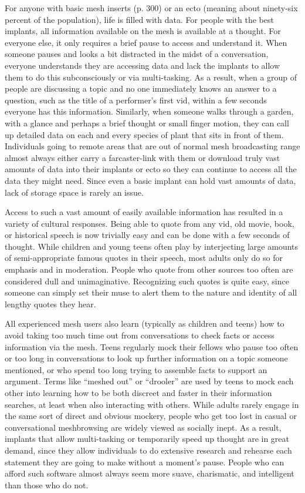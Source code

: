 For anyone with basic mesh inserts (p. 300) or an ecto 
(meaning about ninety-six percent of the population), 
life is filled with data. For people with the best implants, all information available on the mesh is available at a thought. For everyone else, it only requires a 
brief pause to access and understand it. When someone pauses and looks a bit distracted in the midst of a 
conversation, everyone understands they are accessing 
data and lack the implants to allow them to do this 
subconsciously or via multi-tasking. As a result, when 
a group of people are discussing a topic and no one 
immediately knows an answer to a question, such as 
the title of a performer's first vid, within a few seconds 
everyone has this information. Similarly, when someone walks through a garden, with a glance and 
perhaps a brief thought or small finger motion, they 
can call up detailed data on each and every species of 
plant that sits in front of them. Individuals going to 
remote areas that are out of normal mesh broadcasting range almost always either carry a farcaster-link 
with them or download truly vast amounts of data 
into their implants or ecto so they can continue to 
access all the data they might need. Since even a basic 
implant can hold vast amounts of data, lack of storage 
space is rarely an issue.

Access to such a vast amount of easily available 
information has resulted in a variety of cultural 
responses. Being able to quote from any vid, old movie, 
book, or historical speech is now trivially easy and 
can be done with a few seconds of thought. While 
children and young teens often play by interjecting 
large amounts of semi-appropriate famous quotes in 
their speech, most adults only do so for emphasis and 
in moderation. People who quote from other sources 
too often are considered dull and unimaginative. Recognizing such quotes is quite easy, since someone can 
simply set their muse to alert them to the nature and 
identity of all lengthy quotes they hear.

All experienced mesh users also learn (typically as 
children and teens) how to avoid taking too much 
time out from conversations to check facts or access 
information via the mesh. Teens regularly mock their 
fellows who pause too often or too long in conversations to look up further information on a topic 
someone mentioned, or who spend too long trying 
to assemble facts to support an argument. Terms like 
``meshed out'' or ``drooler'' are used by teens to mock 
each other into learning how to be both discreet and 
faster in their information searches, at least when also 
interacting with others. While adults rarely engage 
in the same sort of direct and obvious mockery, 
people who get too lost in casual or conversational 
meshbrowsing are widely viewed as socially inept. As 
a result, implants that allow multi-tasking or temporarily speed up thought are in great demand, since 
they allow individuals to do extensive research and 
rehearse each statement they are going to make without a moment's pause. People who can afford such 
software almost always seem more suave, charismatic, 
and intelligent than those who do not.


